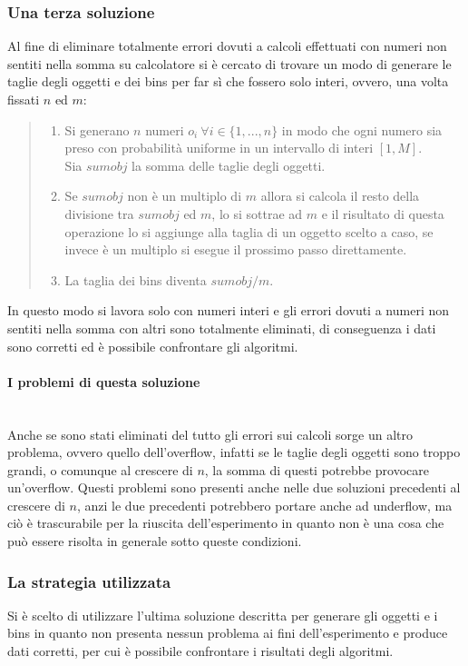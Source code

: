 \subsubsection{Una terza soluzione}
Al fine di eliminare totalmente errori dovuti a calcoli effettuati con numeri non sentiti nella somma su calcolatore 
si è cercato di trovare un modo di generare le taglie degli oggetti e dei bins per far sì che fossero solo interi, ovvero, una volta fissati 
$ n $ ed $ m $:
\begin{quote}
	\begin{enumerate}
		\item Si generano $ n $ numeri $ o_i \: \forall i \in \{1, ..., n\} $ in modo che ogni numero sia preso con probabilità
			  uniforme in un intervallo di interi $ [1, M] $.\\
			  Sia $ sumobj $ la somma delle taglie degli oggetti.
		\item Se $ sumobj $  non è un multiplo di $ m $ allora si calcola il resto della divisione tra $ sumobj $ ed $ m $, lo 
			  si sottrae ad $ m $ e il risultato di questa operazione lo si aggiunge alla taglia di un oggetto scelto a caso, se invece è un multiplo 
			  si esegue il prossimo passo direttamente.
		\item La taglia dei bins diventa $ sumobj/m $.
	\end{enumerate}
\end{quote}
In questo modo si lavora solo con numeri interi e gli errori dovuti a numeri non sentiti nella somma con altri sono totalmente
eliminati, di conseguenza i dati sono corretti ed è possibile confrontare gli algoritmi.

\paragraph{I problemi di questa soluzione}\mbox{}\\
Anche se sono stati eliminati del tutto gli errori sui calcoli sorge un altro problema, ovvero quello dell'overflow, infatti se le taglie
degli oggetti sono troppo grandi, o comunque al crescere di $ n $, la somma di questi potrebbe provocare un'overflow. Questi problemi sono
presenti anche nelle due soluzioni precedenti al crescere di $ n $, anzi le due precedenti potrebbero portare anche ad underflow, ma ciò è trascurabile per
la riuscita dell'esperimento in quanto non è una cosa che può essere risolta in generale sotto queste condizioni.


\subsubsection{La strategia utilizzata}
Si è scelto di utilizzare l'ultima soluzione descritta per generare gli oggetti e i bins in quanto non presenta nessun problema ai fini
dell'esperimento e produce dati corretti, per cui è possibile confrontare i risultati degli algoritmi.


